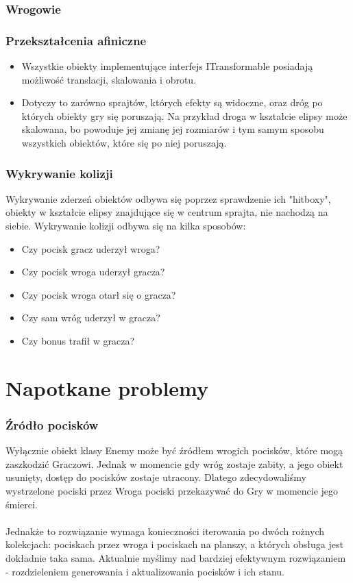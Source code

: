 \documentclass[a4paper,twoside]{article}
\begin{document}
		\section{Wrogowie}
		
		\section{Przekształcenia afiniczne}
			\begin{itemize}
				\item Wszystkie obiekty implementujące interfejs ITransformable posiadają możliwość translacji, skalowania i obrotu.
				\item Dotyczy to zarówno sprajtów, których efekty są widoczne, oraz dróg po których obiekty gry się poruszają. Na przykład droga w kształcie elipsy może skalowana, bo powoduje jej zmianę jej rozmiarów i tym samym sposobu wszystkich obiektów, które się po niej poruszają.
			\end{itemize}
		\section{Wykrywanie kolizji}
			Wykrywanie zderzeń obiektów odbywa się poprzez sprawdzenie ich "hitboxy", obiekty w kształcie elipsy znajdujące się w centrum sprajta, nie nachodzą na siebie. Wykrywanie kolizji odbywa się na kilka sposobów:
			\begin{itemize}
				\item Czy pocisk gracz uderzył wroga?
				\item Czy pocisk wroga uderzył gracza?
				\item Czy pocisk wroga otarł się o gracza?
				\item Czy sam wróg uderzył w gracza?
				\item Czy bonus trafił w gracza?
			\end{itemize}
			
	
	
	\newpage
	\part{Napotkane problemy}
		\section{Źródło pocisków}
			Wyłącznie obiekt klasy Enemy może być źródłem wrogich pocisków, które mogą zaszkodzić Graczowi. Jednak w momencie gdy wróg zostaje zabity, a jego obiekt usunięty, dostęp do pocisków zostaje utracony. Dlatego zdecydowaliśmy wystrzelone pociski przez Wroga pociski przekazywać do Gry w momencie jego śmierci.\\\\
			Jednakże to rozwiązanie wymaga konieczności iterowania po dwóch rożnych kolekcjach: pociskach przez wroga i pociskach na planszy, a których obsługa jest dokładnie taka sama. Aktualnie myślimy nad bardziej efektywnym rozwiązaniem - rozdzieleniem generowania i aktualizowania pocisków i ich stanu.
	
\end{document}
